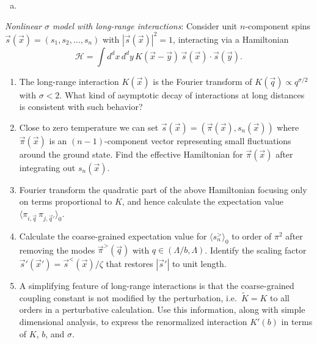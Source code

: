 \begin{solution}
    \begin{enumerate}[(a)]
        \item
    \end{enumerate}
\end{solution}

\begin{problem}
    \textit{Nonlinear $\sigma$ model with long-range interactions}: Consider unit $n$-component spins $\vec{s}(\vec{x}) = (s_1, s_2, \ldots, s_n)$ with $|\vec{s}(\vec{x})|^2 = 1$, interacting via a Hamiltonian
    \[
        \mathcal{H} = \int d^dx\,d^dy\,K(\vec{x}-\vec{y})\,\vec{s}(\vec{x})\cdot\vec{s}(\vec{y}).
    \]

    \begin{enumerate}
        \item[(a)] The long-range interaction $K(\vec{x})$ is the Fourier transform of $K(\vec{q}) \propto q^{\sigma/2}$ with $\sigma < 2$. What kind of asymptotic decay of interactions at long distances is consistent with such behavior?

        \item[(b)] Close to zero temperature we can set $\vec{s}(\vec{x}) = (\vec{\pi}(\vec{x}), s_n(\vec{x}))$ where $\vec{\pi}(\vec{x})$ is an $(n-1)$-component vector representing small fluctuations around the ground state. Find the effective Hamiltonian for $\vec{\pi}(\vec{x})$ after integrating out $s_n(\vec{x})$.

        \item[(c)] Fourier transform the quadratic part of the above Hamiltonian focusing only on terms proportional to $K$, and hence calculate the expectation value $\langle\pi_{i,\vec{q}}\,\pi_{j,\vec{q}'}\rangle_0$.

        \item[(d)] Calculate the coarse-grained expectation value for $\langle s_n^>\rangle_0$ to order of $\pi^2$ after removing the modes $\vec{\pi}^>(\vec{q})$ with $q \in (\Lambda/b, \Lambda)$. Identify the scaling factor $\vec{s}'(\vec{x}') = \vec{s}^<(\vec{x})/\zeta$ that restores $|\vec{s}'|$ to unit length.

        \item[(e)] A simplifying feature of long-range interactions is that the coarse-grained coupling constant is not modified by the perturbation, i.e.\ $\tilde{K} = K$ to all orders in a perturbative calculation. Use this information, along with simple dimensional analysis, to express the renormalized interaction $K'(b)$ in terms of $K$, $b$, and $\sigma$.


\end{enumerate}
\end{problem}
